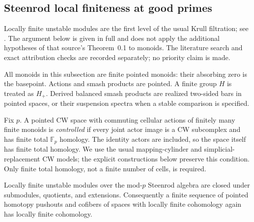 \subsection{Steenrod local finiteness at good primes}

Locally finite unstable modules are the first level of the usual
Krull filtration; see \cite[pp.~519--520]{schwartz2001krull}.
The argument below is given in full and does not apply the additional
hypotheses of that source's Theorem~0.1 to monoids.  The literature
search and exact attribution checks are recorded separately; no
priority claim is made.

All monoids in this subsection are finite pointed monoids: their
absorbing zero is the basepoint.  Actions and smash products are
pointed.  A finite group $H$ is treated as $H_+$.  Derived balanced
smash products are realized two-sided bars in pointed spaces, or
their suspension spectra when a stable comparison is specified.

\begin{definition}\label{E:controlled-action}
Fix $p$.  A pointed CW space with commuting cellular actions of finitely many
finite monoids is \emph{controlled} if every joint actor image is a
CW subcomplex and has finite total $\mathbb F_p$ homology.  The identity
actors are included, so the space itself has finite total homology.
We use the usual mapping-cylinder and simplicial-replacement CW
models; the explicit constructions below preserve this condition.
Only finite total homology, not a finite number of cells, is required.
\end{definition}

\begin{lemma}\label{E:LF-unstable-extension}
Locally finite unstable modules over the mod-$p$ Steenrod algebra
are closed under submodules, quotients, and extensions.  Consequently
a finite sequence of pointed homotopy pushouts and cofibers of spaces
with locally finite cohomology again has locally finite cohomology.
\end{lemma}

